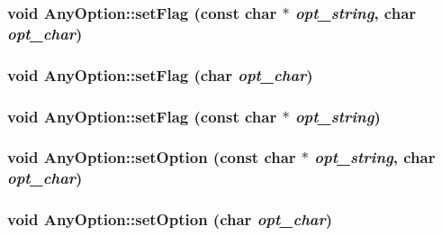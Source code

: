 \label{classAnyOption_a4eeaaf6a433ae7d0724243581436914b}
\hypertarget{classAnyOption_a6b644d13279528d3c501323f9826f103}{
\subsubsection[{setFlag}]{\setlength{\rightskip}{0pt plus 5cm}void AnyOption::setFlag (const char $\ast$ {\em opt\_\-string}, \/  char {\em opt\_\-char})}}
\label{classAnyOption_a6b644d13279528d3c501323f9826f103}
\hypertarget{classAnyOption_a1e90db23b41021bd60d4ecdf0e169eb4}{
\subsubsection[{setFlag}]{\setlength{\rightskip}{0pt plus 5cm}void AnyOption::setFlag (char {\em opt\_\-char})}}
\label{classAnyOption_a1e90db23b41021bd60d4ecdf0e169eb4}
\hypertarget{classAnyOption_a674db5274da842af95a58067e49a8808}{
\subsubsection[{setFlag}]{\setlength{\rightskip}{0pt plus 5cm}void AnyOption::setFlag (const char $\ast$ {\em opt\_\-string})}}
\label{classAnyOption_a674db5274da842af95a58067e49a8808}
\hypertarget{classAnyOption_abc37993c84c44c368e9ec1d425c913f5}{
\subsubsection[{setOption}]{\setlength{\rightskip}{0pt plus 5cm}void AnyOption::setOption (const char $\ast$ {\em opt\_\-string}, \/  char {\em opt\_\-char})}}
\label{classAnyOption_abc37993c84c44c368e9ec1d425c913f5}
\hypertarget{classAnyOption_a45d3a142b3b222239640cb15febba737}{
\subsubsection[{setOption}]{\setlength{\rightskip}{0pt plus 5cm}void AnyOption::setOption (char {\em opt\_\-char})}}
\label{classAnyOption_a45d3a142b3b222239640cb15febba737}
